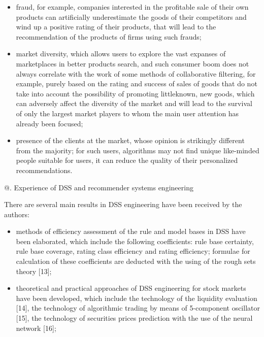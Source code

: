 \documentclass[10pt, a4paper]{article}
\makeatletter
\newcommand*{\rom}[1]{\expandafter\@slowromancap\romannumeral#1@}
\makeatother
\begin{document}
\begin{multicols}{2}
\begin{itemize}[itemsep=0pt, parsep=0pt]
\item fraud, for example, companies interested in the
profitable sale of their own products can artificially
underestimate the goods of their competitors and
wind up a positive rating of their products, that will
lead to the recommendation of the products of firms
using such frauds;


\item market diversity, which allows users to explore the
vast expanses of marketplaces in better products
search, and such consumer boom does not always
correlate with the work of some methods of
collaborative filtering, for example, purely based on
the rating and success of sales of goods that do not
take into account the possibility of promoting little\-known, new goods, which can adversely affect the
diversity of the market and will lead to the survival
of only the largest market players to whom the main
user attention has already been focused;

\item presence of the clients at the market, whose opinion is
strikingly different from the majority; for such users,
algorithms may not find unique like-minded people
suitable for users, it can reduce the quality of their
personalized recommendations.

\end{itemize}

\begin{center}

\vspace{-1em}
\rom{5}. Experience of DSS and recommender systems
engineering

\end{center}

\vspace{-1.5em}
There are several main results in DSS engineering have
been received by the authors:
\vspace{-2em}


\begin{itemize}[itemsep=0pt, parsep=0pt]

\item methods of efficiency assessment of the rule and
model bases in DSS have been elaborated, which
include the following coefficients: rule base certainty,
rule base coverage, rating class efficiency and
rating efficiency; formulae for calculation of these
coefficients are deducted with the using of the rough
sets theory [13];

\item theoretical and practical approaches of DSS
engineering for stock markets have been developed,
which include the technology of the liquidity
evaluation [14], the technology of algorithmic trading
by means of 5-component oscillator [15], the
technology of securities prices prediction with the
use of the neural network [16];


\end{itemize}
\end{multicols}
\end{document}
